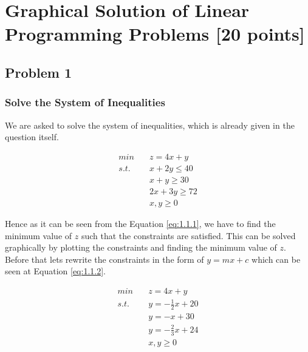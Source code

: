 \documentclass[unicode,11pt,a4paper,oneside,numbers=endperiod,openany]{scrartcl}
\begin{document}
\setassignment
{}

\newline

\assignmentpolicy

\newpage

\section{Graphical Solution of Linear Programming Problems [20 points]}
\subsection{Problem 1}
\subsubsection{Solve the System of Inequalities}
We are asked to solve the system of inequalities, which is already given in the question itself.

\begin{equation}
	\begin{aligned}
		min \quad  & z = 4x + y      \\
		s.t. \quad & x + 2y \leq 40  \\
		           & x + y \geq 30   \\
		           & 2x + 3y \geq 72 \\
		           & x, y \geq 0
	\end{aligned}
	\label{eq:1.1.1}
\end{equation}

Hence as it can be seen from the Equation \ref{eq:1.1.1}, we have to find the minimum value of $z$ such that the constraints are satisfied. This can be solved graphically by plotting the constraints and finding the minimum value of $z$. Before that lets rewrite the constraints in the form of $y = mx + c$ which can be seen at Equation \ref{eq:1.1.2}.

\begin{equation}
	\begin{aligned}
		min \quad  & z = 4x + y             \\
		s.t. \quad & y = -\frac{1}{2}x + 20 \\
		           & y = -x + 30            \\
		           & y = -\frac{2}{3}x + 24 \\
		           & x, y \geq 0
	\end{aligned}
	\label{eq:1.1.2}
\end{equation}
\end{document}

